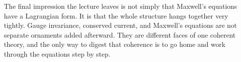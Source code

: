 The final impression the lecture leaves is not simply that Maxwell's equations have a Lagrangian form. It is that the whole structure hangs together very tightly. Gauge invariance, conserved current, and Maxwell's equations are not separate ornaments added afterward. They are different faces of one coherent theory, and the only way to digest that coherence is to go home and work through the equations step by step.